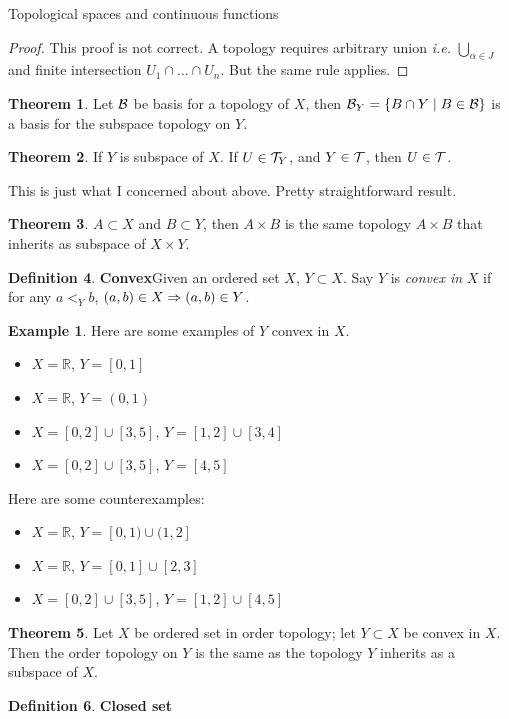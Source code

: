 \documentclass{report}
\theoremstyle{definition}
\newtheorem{theorem}{Theorem}[chapter]
\newtheorem{definition}[theorem]{Definition}
\newtheorem{example}{Example}[theorem]
\newcommand{\defn}[1]{\textbf{#1}\label{#1}\index{#1}}
\newcommand{\set}[1]{\ensuremath\{#1\}}
\newcommand{\ie}{\textit{i.e.}\xspace}
\newcommand{\RA}{\ensuremath\Rightarrow}
\newcommand{\RR}{\mathbb{R}}
\newcommand{\intersect}{\cap}
\newcommand{\union}{\cup}
\newcommand{\Union}{\bigcup}
\begin{document}
\begin{chapter}{Topological spaces and continuous functions}
\begin{proof}
    This proof is not correct. A topology requires arbitrary union \ie
    $\Union_{\alpha\in J}$ and finite intersection
    $U_1\intersect\dots\intersect U_n$. But the same rule applies.
  \end{proof}
  \begin{theorem}
    Let $\mathcal{B}$ be basis for a topology of $X$, then
    $\B_Y=\set{B\intersect Y\mid B\in\B}$
    is a basis for the subspace topology on $Y$.
  \end{theorem}
  \begin{theorem}
    If $Y$ is subspace of $X$. If $U\in\mathcal{T}_Y$, and $Y\in\mathcal{T}$, then
    $U\in\mathcal{T}$.
  \end{theorem}
  This is just what I concerned about above. Pretty straightforward
  result.
  \begin{theorem}
    $A\subset X$ and $B\subset Y$, then $A\times B$ is the same
    topology $A\times B$ that inherits as subspace of $X\times Y$.
  \end{theorem}
  \begin{definition}\defn{Convex}
    Given an ordered set $X$, $Y\subset X$. Say $Y$ is \emph{convex in
    } $X$ if for any $a<_Yb$, $(a,b)\in X\RA (a,b)\in Y$.
  \end{definition}
  \begin{example} Here are some examples of $Y$ convex in $X$.
    \begin{itemize}
    \item $X=\RR$, $Y=[0,1]$
    \item $X=\RR$, $Y=(0,1)$
    \item $X=[0,2]\union[3,5]$, $Y=[1,2]\union[3,4]$
    \item $X=[0,2]\union[3,5]$, $Y=[4,5]$
    \end{itemize}
    Here are some counterexamples:
    \begin{itemize}
    \item $X=\RR$, $Y=[0,1)\union(1,2]$
    \item $X=\RR$, $Y=[0,1]\union[2,3]$
    \item $X=[0,2]\union[3,5]$, $Y=[1,2]\union[4,5]$
    \end{itemize}
  \end{example}
  \begin{theorem}
    Let $X$ be ordered set in order topology; let $Y\subset X$ be
    convex in $X$. Then the order topology on $Y$ is the same as the
    topology $Y$ inherits as a subspace of $X$.
  \end{theorem}
  \begin{definition}\defn{Closed set}

\end{definition}
\end{chapter}
\end{document}
